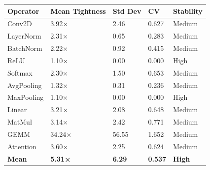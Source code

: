 \begin{tabular}{lllll}
\toprule
Operator & Mean Tightness & Std Dev & CV & Stability \\
\midrule
Conv2D & 3.92× & 2.46 & 0.627 & Medium \\
LayerNorm & 2.31× & 0.65 & 0.283 & Medium \\
BatchNorm & 2.22× & 0.92 & 0.415 & Medium \\
ReLU & 1.10× & 0.00 & 0.000 & High \\
Softmax & 2.30× & 1.50 & 0.653 & Medium \\
AvgPooling & 1.32× & 0.31 & 0.236 & Medium \\
MaxPooling & 1.10× & 0.00 & 0.000 & High \\
Linear & 3.21× & 2.08 & 0.648 & Medium \\
MatMul & 3.14× & 2.42 & 0.771 & Medium \\
GEMM & 34.24× & 56.55 & 1.652 & Medium \\
Attention & 3.60× & 2.25 & 0.624 & Medium \\
\textbf{Mean} & \textbf{5.31×} & \textbf{6.29} & \textbf{0.537} & \textbf{High} \\
\bottomrule
\end{tabular}
